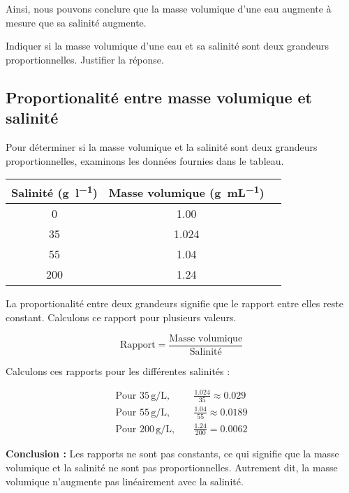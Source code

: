 \documentclass[answers]{exam}
\begin{document}
\begin{questions}
\begin{solution}
Ainsi, nous pouvons conclure que la masse volumique d'une eau augmente à mesure que sa salinité augmente.

\end{solution}

\question[2] Indiquer si la masse volumique d’une eau et sa salinité sont deux grandeurs proportionnelles. Justifier la réponse.


  \end{questions}




\begin{solution}

\subsection*{Proportionalité entre masse volumique et salinité}

Pour déterminer si la masse volumique et la salinité sont deux grandeurs proportionnelles, examinons les données fournies dans le tableau.

\begin{center}
\begin{tabular}{|c|c|c|}
\hline
Salinité (\si{\gram\per\litre}) & Masse volumique (\si{\gram\per\milli\liter}) \\
\hline
0 & 1.00 \\
35 & 1.024 \\
55 & 1.04 \\
200 & 1.24 \\
\hline
\end{tabular}
\end{center}

La proportionalité entre deux grandeurs signifie que le rapport entre elles reste constant. Calculons ce rapport pour plusieurs valeurs.

\[
\text{Rapport} = \frac{\text{Masse volumique}}{\text{Salinité}}
\]

Calculons ces rapports pour les différentes salinités :

\begin{align*}
\text{Pour } 35\, \si{\gram/\liter}, &\quad \frac{1.024}{35} \approx 0.029 \\
\text{Pour } 55\, \si{\gram/\liter}, &\quad \frac{1.04}{55} \approx 0.0189 \\
\text{Pour } 200\, \si{\gram/\liter}, &\quad \frac{1.24}{200} = 0.0062
\end{align*}

\textbf{Conclusion :} Les rapports ne sont pas constants, ce qui signifie que la masse volumique et la salinité ne sont pas proportionnelles. Autrement dit, la masse volumique n'augmente pas linéairement avec la salinité.

\end{solution}
\end{document}

